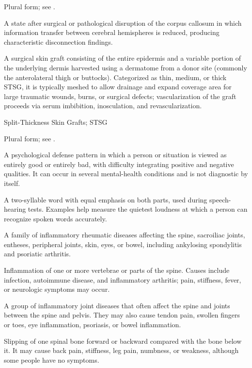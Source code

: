  Plural form; see .

 A state after surgical or pathological disruption of the corpus callosum in which information transfer between cerebral hemispheres is reduced, producing characteristic disconnection findings.

 A surgical skin graft consisting of the entire epidermis and a variable portion of the underlying dermis harvested using a dermatome from a donor site (commonly the anterolateral thigh or buttocks). Categorized as thin, medium, or thick STSG, it is typically meshed to allow drainage and expand coverage area for large traumatic wounds, burns, or surgical defects; vascularization of the graft proceeds via serum imbibition, inosculation, and revascularization.

\synonyms
Split-Thickness Skin Grafts; STSG

 Plural form; see .

 A psychological defense pattern in which a person or situation is viewed as entirely good or entirely bad, with difficulty integrating
positive and negative qualities. It can occur in several mental-health conditions and is
not diagnostic by itself.

 A two-syllable word with equal emphasis on both parts, used during speech-hearing tests. Examples help measure the quietest loudness at which a person can recognize spoken words accurately.

 A family of inflammatory rheumatic diseases affecting the spine, sacroiliac joints, entheses, peripheral joints, skin, eyes, or bowel, including ankylosing spondylitis and psoriatic arthritis.

 Inflammation of one or more vertebrae or parts of the spine. Causes include infection, autoimmune disease, and inflammatory arthritis; pain, stiffness, fever, or neurologic symptoms may occur.

 A group of inflammatory joint diseases that often affect the spine and joints between the spine and pelvis. They may also cause tendon pain, swollen fingers or toes, eye inflammation, psoriasis, or bowel inflammation.

 Slipping of one spinal bone forward or backward compared with the bone below it. It may cause back pain, stiffness, leg pain, numbness, or weakness, although some people have no symptoms.

